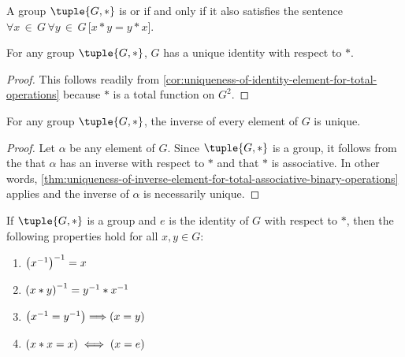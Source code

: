 \begin{dfn}
    \label{dfn:abelian-group}
    A group \( \tuple{G, \ast} \) is  or  if and only if it also satisfies the sentence
    \( \forall x\,{\in}\,G \, \forall y\,{\in}\,G \, \big[ x \ast y = y \ast x \big] \).
\end{dfn}

\begin{thm}
    \label{thm:-group-uniqueness-of-identity}
    For any group \( \tuple{G, \ast} \), \( G \) has a unique identity with respect to \( \ast \).
\end{thm}

\begin{proof}
    This follows readily from \cref{cor:uniqueness-of-identity-element-for-total-operations} because
    \( \ast \) is a total function on \( G^{2} \).
\end{proof}

\begin{thm}
    \label{thm:group-uniqueness-of-inverses}
    For any group \( \tuple{G, \ast} \), the inverse of every element of \( G \) is unique.
\end{thm}

\begin{proof}
    Let \( \alpha \) be any element of \( G \).
    Since \( \tuple{G, \ast} \) is a group, it follows from the  that \( \alpha \) has an inverse
    with respect to \( \ast \) and that \( \ast \) is associative.
    In other words, \cref{thm:uniqueness-of-inverse-element-for-total-associative-binary-operations} applies
    and the inverse of \( \alpha \) is necessarily unique.
\end{proof}

\begin{thm}
    \label{thm:group-basic-properties}
    If \( \tuple{G, \ast} \) is a group and \( e \) is the identity of \( G \) with respect to \( \ast \),
    then the following properties hold for all \( x,y \in G \):
    \begin{enumerate}[topsep=2pt,noitemsep,label=\textup{\texttt{(\alph*)}}]
        \item \( \mleft( x^{-1} \mright)^{-1} = x \) \label{enum:group-inverse-of-inverse-is-itself}
        \item \( \mleft( x \ast y \mright)^{-1} = y^{-1} \ast x^{-1} \) \label{enum:group-inverse-of-product}
        \item \( \mleft( x^{-1} = y^{-1} \mright) {\implies} \mleft( x = y \mright) \) \label{enum:group-equal-inverses-implies-equal-elements}
        \item \( \mleft(x \ast x = x\mright) \iff \mleft( x = e \mright) \) \label{enum:group-idempotent-element-iff-element-equals-identity}
    \end{enumerate}
\end{thm}

